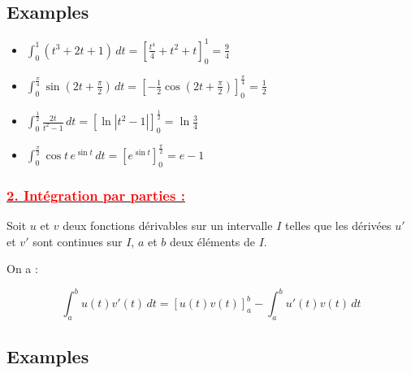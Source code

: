 \documentclass[12pt]{article}
\begin{document}
\subsection*{Examples}

\begin{itemize}
    \item \( \int_0^1 \left( t^3 + 2t + 1 \right) \, dt = \left[ \frac{t^4}{4} + t^2 + t \right]_0^1 = \frac{9}{4} \)
    
    \item \( \int_0^{\frac{\pi}{4}} \sin \left( 2t + \frac{\pi}{2} \right) \, dt = \left[ -\frac{1}{2} \cos \left( 2t + \frac{\pi}{2} \right) \right]_0^{\frac{\pi}{4}} = \frac{1}{2} \)
    
    \item \( \int_0^{\frac{1}{2}} \frac{2t}{t^2 - 1} \, dt = \left[ \ln |t^2 - 1| \right]_0^{\frac{1}{2}} = \ln \frac{3}{4} \)
    
    \item \( \int_0^{\frac{\pi}{2}} \cos t \, e^{\sin t} \, dt = \left[ e^{\sin t} \right]_0^{\frac{\pi}{2}} = e - 1 \)
\end{itemize}

\subsubsection*{\underline{\textcolor{red}{2. Intégration par parties :}}}
Soit \( u \) et \( v \) deux fonctions dérivables sur un intervalle \( I \) telles que les dérivées \( u' \) et \( v' \) sont continues sur \( I \), \( a \) et \( b \) deux éléments de \( I \).

On a :

\[
\int_a^b u(t) v'(t) \, dt = \left[ u(t) v(t) \right]_a^b - \int_a^b u'(t) v(t) \, dt
\]

\subsection*{Examples}
\end{document}
